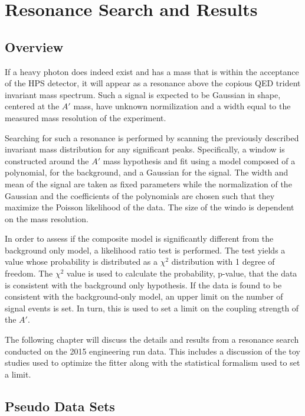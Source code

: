 
\chapter{Resonance Search and Results}

\section{Overview}

If a heavy photon does indeed exist and has a mass that is within the acceptance
of the HPS detector, it will appear as a resonance above the copious QED trident
invariant mass spectrum.  Such a signal is expected to be Gaussian in shape,
centered at the $A'$ mass, have unknown normilization and a width equal to the
measured mass resolution of the experiment.

Searching for such a resonance is performed by scanning the previously described
invariant mass distribution for any significant peaks.  Specifically, a window
is constructed around the $A'$ mass hypothesis and fit using a model composed
of a polynomial, for the background, and a Gaussian for the signal.  The width
and mean of the signal are taken as fixed parameters while the normalization of
the Gaussian and the coefficients of the polynomials are chosen such that they
maximize the Poisson likelihood of the data.  The size of the windo is dependent
on the mass resolution. 

In order to assess if the composite model is significantly different from the 
background only model, a likelihood ratio test is performed.  The test yields a
value whose probability is distributed as a $\chi^2$ distribution with 1 degree
of freedom.  The $\chi^2$ value is used to calculate the probability, p-value, 
that the data is consistent with the background only hypothesis.  If the data 
is found to be consistent with the background-only model, an upper limit on the
number of signal events is set.  In turn, this is used to set a limit on the 
coupling strength of the $A'$.

The following chapter will discuss the details and results from a resonance 
search conducted on the 2015 engineering run data.  This includes a discussion
of the toy studies used to optimize the fitter along with the statistical 
formalism used to set a limit.


\section{Pseudo Data Sets}

